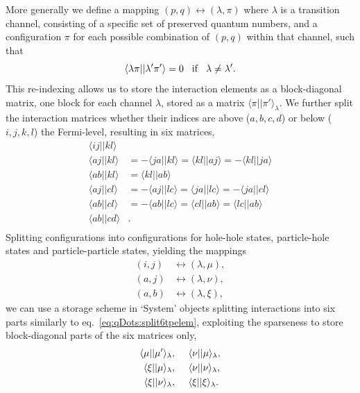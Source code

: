 More generally we define a mapping
$(p,q) \leftrightarrow (\lambda,\pi)$
where $\lambda$ is a transition channel, consisting of a specific set of preserved quantum numbers, and a configuration $\pi$ for each possible combination of $(p,q)$ within that channel, such that 
\begin{equation}
\langle \lambda \pi || \lambda' \pi' \rangle = 0
\hspace{3mm}\textrm{if}\hspace{3mm}
\lambda \neq \lambda' .
\end{equation}
This re-indexing allows us to store the interaction elements as a block-diagonal matrix, one block  for each channel $\lambda$, stored as a matrix $\langle \pi || \pi' \rangle_{\lambda}$.
We further split the interaction matrices whether their indices are above ($a,b,c,d$) or below ($i,j,k,l$) the Fermi-level, resulting in six matrices,
\begin{equation}
\label{eq:qDots:split6tpelem}
\begin{split}
\langle ij||kl \rangle& \\
\langle aj||kl \rangle& = -\langle ja||kl \rangle = \langle kl||aj \rangle = -\langle kl||ja \rangle \\
\langle ab||kl \rangle& = \langle kl||ab \rangle \\
\langle aj||cl \rangle& = -\langle aj||lc \rangle = \langle ja||lc \rangle = -\langle ja||cl \rangle\\
\langle ab||cl \rangle& = -\langle ab||lc \rangle = \langle cl||ab \rangle = \langle lc||ab \rangle \\
\langle ab||cd \rangle&  .\\
\end{split}
\end{equation}
Splitting configurations into configurations for hole-hole states, particle-hole states and particle-particle states, yielding the mappings
\begin{equation}
\begin{split}
(i,j) &\leftrightarrow (\lambda, \mu), \\
(a,j) &\leftrightarrow (\lambda, \nu), \\
(a,b) &\leftrightarrow (\lambda, \xi),
\end{split}
\end{equation}
we can use a storage scheme in `System' objects splitting interactions into six parts similarly to eq.~\eqref{eq:qDots:split6tpelem}, exploiting the sparseness to store block-diagonal parts of the six matrices only, 
\begin{equation}
\begin{split}
\langle \mu || \mu' \rangle_{\lambda},& \hspace{5mm}
\langle \nu || \mu \rangle_{\lambda}, \\
\langle \xi || \mu \rangle_{\lambda},& \hspace{5mm}
\langle \nu || \nu \rangle_{\lambda}, \\ 
\langle \xi || \nu \rangle_{\lambda},& \hspace{5mm}
\langle \xi || \xi \rangle_{\lambda} .
\end{split}
\end{equation}

